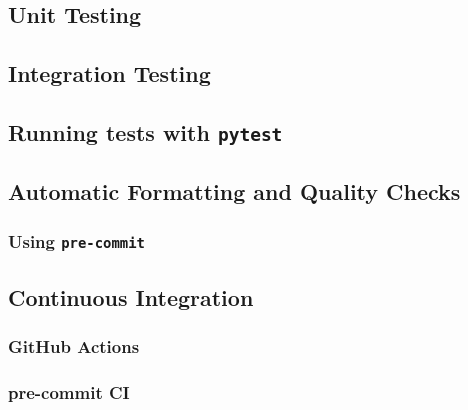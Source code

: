 \subsection{Unit Testing}

\subsection{Integration Testing}

\subsection{Running tests with \texttt{pytest}}
\subsection{Automatic Formatting and Quality Checks}
\subsubsection{Using \texttt{pre-commit}}

\subsection{Continuous Integration}
\subsubsection{GitHub Actions}
\subsubsection{pre-commit CI}

\clearpage
